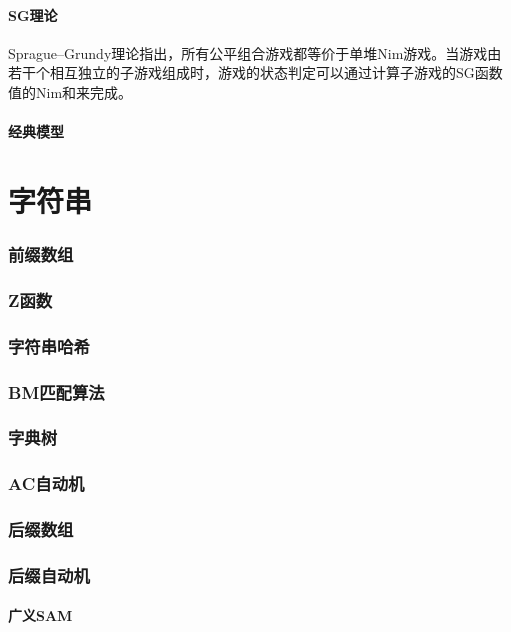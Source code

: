 \documentclass[12pt,a4paper]{article}
\begin{document}
\subsection{SG理论}
Sprague–Grundy理论指出，所有公平组合游戏都等价于单堆Nim游戏。当游戏由若干个相互独立的子游戏组成时，游戏的状态判定可以通过计算子游戏的SG函数值的Nim和来完成。
\subsection{经典模型}

\newpage
\part{字符串}
\section{前缀数组} %

\newpage
\section{Z函数}

\newpage
\section{字符串哈希}

\newpage
\section{BM匹配算法}

\newpage
\section{字典树} 

\newpage
\section{AC自动机}

\newpage
\section{后缀数组} %

\newpage
\section{后缀自动机}
\subsection{广义SAM}
\end{document}
